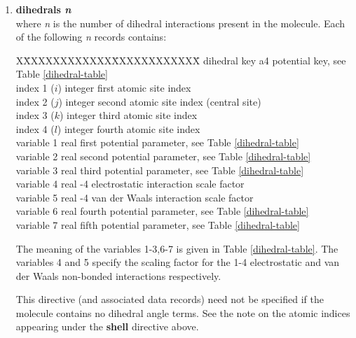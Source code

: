 \begin{enumerate}
\item{\bf dihedrals {\em n}} \\
where {\em n} is the number of dihedral interactions present in
the molecule.  Each of the following {\em n} records contains:
\begin{tabbing}
X\=XXXXXXXXXXXX\=XXXXXXXXXXXX\=\kill
\> dihedral key  \> a4      \> potential key, see Table \ref{dihedral-table} \\
\> index 1 ($i$) \> integer \> first atomic site index \\
\> index 2 ($j$) \> integer \> second atomic site index (central site) \\
\> index 3 ($k$) \> integer \> third atomic site index \\
\> index 4 ($l$) \> integer \> fourth atomic site index \\
\> variable 1    \> real    \> first potential parameter, see Table \ref{dihedral-table} \\
\> variable 2    \> real    \> second potential parameter, see Table \ref{dihedral-table} \\
\> variable 3    \> real    \> third potential parameter, see Table \ref{dihedral-table} \\
\> variable 4    \> real    -4 electrostatic interaction scale factor \\
\> variable 5    \> real    -4 van der Waals interaction scale factor \\
\> variable 6    \> real    \> fourth potential parameter, see Table \ref{dihedral-table} \\
\> variable 7    \> real    \> fifth potential parameter, see Table \ref{dihedral-table}
\end{tabbing}
The meaning of the variables 1-3,6-7 is given in Table
\ref{dihedral-table}.  The variables 4 and 5 specify the scaling
factor for the 1-4 electrostatic and van der Waals non-bonded
interactions respectively.

This directive (and associated data records) need not be specified
if the molecule contains no dihedral
angle terms.  See the note on the atomic indices appearing under
the {\bf shell} directive above.


\end{enumerate}
